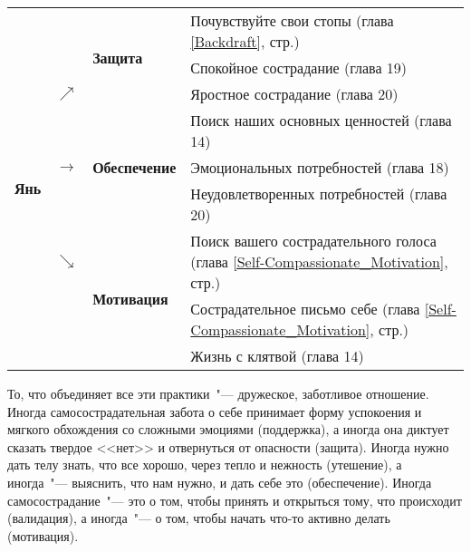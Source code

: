 \begin{table}[!h]
	\begin{center}
		\setlength{\extrarowheight}{1mm}
		\begin{tabular}{p{1.2cm}p{3mm}p{2.6cm}||p{9.9cm}}
			\cline{3-4}
			\multirow{9}{*}{{\LARGE\textbf{Янь}}} &  & \multirow{3}{*}{\textbf{Защита}} & {\small Почувствуйте свои стопы (глава \ref{Backdraft}, стр.\:\pageref{IP:Feeling_the_Soles_of_Your_Feet})} \\ 
			&  &  & {\small Спокойное сострадание (глава 19)}\\ 
			& $\nearrow$ &  & {\small Яростное сострадание (глава 20)}\\ \cline{3-4}
			& \multirow{3}{*}{\textbf{$\rightarrow$}} & \multirow{3}{*}{\textbf{Обеспечение}} & {\small Поиск наших основных ценностей (глава 14)}\\
			&   &   & {\small Эмоциональных потребностей} (глава 18)\\
			&   &   & {\small Неудовлетворенных потребностей (глава 20)}\\ \cline{3-4}
			& $\searrow$ & \multirow{3}{*}{\textbf{Мотивация}} & {\small Поиск вашего сострадательного голоса (глава \ref{Self-Compassionate_Motivation}, стр.\:\pageref{EX:Finding_Your_Compassionate_Voice})}\\
			&   &   & {\small Сострадательное письмо себе (глава \ref{Self-Compassionate_Motivation}, стр.\:\pageref{IP:Compassionate_Letter_to_Myself})}\\
			&   &   & {\small Жизнь с клятвой (глава 14)}\\ \cline{3-4}
		\end{tabular}
		\setlength{\extrarowheight}{0mm}
	\end{center}
\end{table} 

То, что объединяет все эти практики~"--- дружеское, заботливое отношение. Иногда самосострадательная забота о себе принимает форму успокоения и мягкого обхождения со сложными эмоциями (поддержка), а иногда она диктует сказать твердое <<нет>> и отвернуться от опасности (защита). Иногда нужно дать телу знать, что все хорошо, через тепло и нежность (утешение), а иногда~"--- выяснить, что нам нужно, и дать себе это (обеспечение). Иногда самосострадание~"--- это о том, чтобы принять и открыться тому, что происходит (валидация), а иногда~"--- о том, чтобы начать что-то активно делать (мотивация). 

